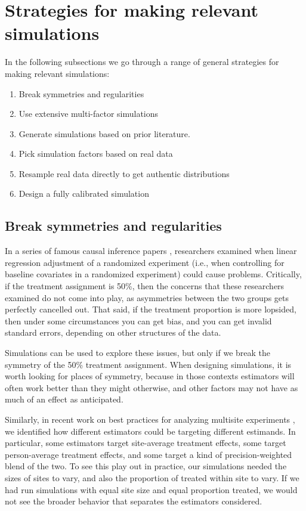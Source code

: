 \documentclass[
]{book}
\providecommand{\tightlist}{%
  \setlength{\itemsep}{0pt}\setlength{\parskip}{0pt}}
\begin{document}
\section{Strategies for making relevant simulations}\label{strategies-for-making-relevant-simulations}

In the following subsections we go through a range of general strategies for making relevant simulations:

\begin{enumerate}
\def\labelenumi{\arabic{enumi}.}
\tightlist
\item
  Break symmetries and regularities
\item
  Use extensive multi-factor simulations
\item
  Generate simulations based on prior literature.
\item
  Pick simulation factors based on real data
\item
  Resample real data directly to get authentic distributions
\item
  Design a fully calibrated simulation
\end{enumerate}

\subsection{Break symmetries and regularities}\label{break-symmetries-and-regularities}

In a series of famous causal inference papers \citep{lin2013agnostic, freedman2008regression}, researchers examined when linear regression adjustment of a randomized experiment (i.e., when controlling for baseline covariates in a randomized experiment) could cause problems.
Critically, if the treatment assignment is 50\%, then the concerns that these researchers examined do not come into play, as asymmetries between the two groups gets perfectly cancelled out.
That said, if the treatment proportion is more lopsided, then under some circumstances you can get bias, and you can get invalid standard errors, depending on other structures of the data.

Simulations can be used to explore these issues, but only if we break the symmetry of the 50\% treatment assignment.
When designing simulations, it is worth looking for places of symmetry, because in those contexts estimators will often work better than they might otherwise, and other factors may not have as much of an effect as anticipated.

Similarly, in recent work on best practices for analyzing multisite experiments \citep{miratrix2021applied}, we identified how different estimators could be targeting different estimands.
In particular, some estimators target site-average treatment effects, some target person-average treatment effects, and some target a kind of precision-weighted blend of the two.
To see this play out in practice, our simulations needed the sizes of sites to vary, and also the proportion of treated within site to vary.
If we had run simulations with equal site size and equal proportion treated, we would not see the broader behavior that separates the estimators considered.
\end{document}
